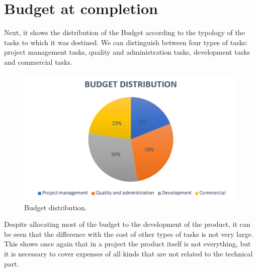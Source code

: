 \section{Budget at completion}

Next, it shows the distribution of the Budget according to the typology of the tasks to which it was destined. We can distinguish between four types of tasks: project management tasks, quality and administration tasks, development tasks and commercial tasks.

\begin{figure}[H]
	\centering
	\includegraphics[width=0.65\linewidth]{./images/BudgetDistribution}
	\caption[Budget distribution]{Budget distribution.}
	\label{fig:BudgetDistribution}
\end{figure} 

Despite allocating most of the budget to the development of the product, it can be seen that the difference with the cost of other types of tasks is not very large. This shows once again that in a project the product itself is not everything, but it is necessary to cover expenses of all kinds that are not related to the technical part.